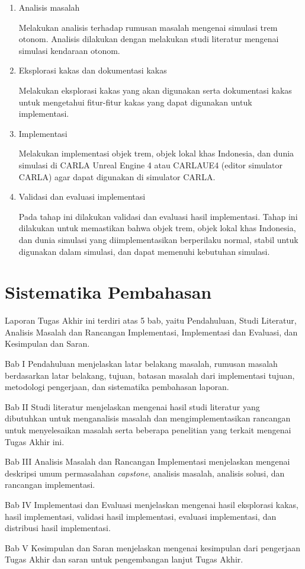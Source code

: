 \begin{enumerate}

    \item Analisis masalah

    Melakukan analisis terhadap rumusan masalah mengenai simulasi trem otonom.
    Analisis dilakukan dengan melakukan studi literatur mengenai simulasi
    kendaraan otonom.

    \item Eksplorasi kakas dan dokumentasi kakas

    Melakukan eksplorasi kakas yang akan digunakan serta dokumentasi kakas untuk
    mengetahui fitur-fitur kakas yang dapat digunakan untuk implementasi.

    \item Implementasi

    Melakukan implementasi objek trem, objek lokal khas Indonesia, dan
    dunia simulasi di CARLA Unreal Engine 4 atau CARLAUE4 (editor simulator
    CARLA) agar dapat digunakan di simulator CARLA.

    \item Validasi dan evaluasi implementasi

    Pada tahap ini dilakukan validasi dan evaluasi hasil implementasi. Tahap ini
    dilakukan untuk memastikan bahwa objek trem, objek lokal khas Indonesia, dan
    dunia simulasi yang diimplementasikan berperilaku normal, stabil untuk
    digunakan dalam simulasi, dan dapat memenuhi kebutuhan simulasi.

\end{enumerate}

\section{Sistematika Pembahasan}

Laporan Tugas Akhir ini terdiri atas 5 bab, yaitu Pendahuluan, Studi Literatur,
Analisis Masalah dan Rancangan Implementasi, Implementasi dan Evaluasi, dan
Kesimpulan dan Saran.

Bab I Pendahuluan menjelaskan latar belakang masalah, rumusan masalah
berdasarkan latar belakang, tujuan, batasan masalah dari implementasi tujuan,
metodologi pengerjaan, dan sistematika pembahasan laporan.

Bab II Studi literatur menjelaskan mengenai hasil studi literatur yang
dibutuhkan untuk menganalisis masalah dan mengimplementasikan rancangan untuk
menyelesaikan masalah serta beberapa penelitian yang terkait mengenai Tugas
Akhir ini.

Bab III Analisis Masalah dan Rancangan Implementasi menjelaskan mengenai
deskripsi umum permasalahan \textit{capstone}, analisis masalah, analisis
solusi, dan rancangan implementasi.

Bab IV Implementasi dan Evaluasi menjelaskan mengenai hasil eksplorasi kakas,
hasil implementasi, validasi hasil implementasi, evaluasi
implementasi, dan distribusi hasil implementasi.

Bab V Kesimpulan dan Saran menjelaskan mengenai kesimpulan dari pengerjaan Tugas
Akhir dan saran untuk pengembangan lanjut Tugas Akhir.
